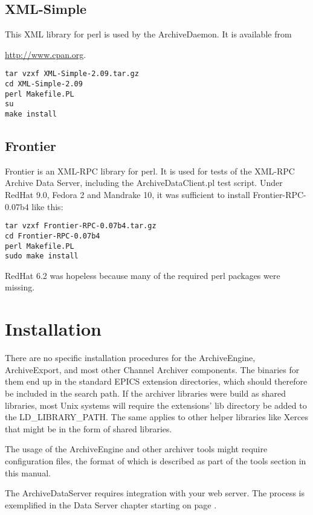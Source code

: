 \subsection{XML-Simple}
This XML library for perl is used by the ArchiveDaemon.
It is available from 
\begin{center}
\href{http://www.cpan.org}{http://www.cpan.org}.
\end{center}
\begin{lstlisting}[keywordstyle=\sffamily]
tar vzxf XML-Simple-2.09.tar.gz
cd XML-Simple-2.09
perl Makefile.PL
su
make install
\end{lstlisting}

\subsection{Frontier}
Frontier is an XML-RPC library for perl.
It is used for tests of the XML-RPC Archive Data Server,
including the ArchiveDataClient.pl test script.
Under RedHat 9.0, Fedora 2 and Mandrake 10, it was sufficient to install
Frontier-RPC-0.07b4 like this:
\begin{lstlisting}[keywordstyle=\sffamily]
tar vzxf Frontier-RPC-0.07b4.tar.gz
cd Frontier-RPC-0.07b4
perl Makefile.PL
sudo make install
\end{lstlisting}

\noindent RedHat 6.2 was hopeless because many of the required perl
packages were missing.

\section{Installation}
There are no specific installation procedures for the ArchiveEngine,
ArchiveExport, and most other Channel Archiver components. The
binaries for them end up in the standard EPICS extension directories,
which should therefore be included in the search path. If the archiver
libraries were build as shared libraries, most Unix systems will
require the extensions' lib directory be added to the
LD\_LIBRARY\_PATH. The same applies to other helper libraries like
Xerces that might be in the form of shared libraries.

The usage of the ArchiveEngine and other archiver tools might require
configuration files, the format of which is described as part of the
tools section in this manual.

The ArchiveDataServer requires integration with your web server. The
process is exemplified in the Data Server chapter starting on page
\pageref{sec:dataserver}.

